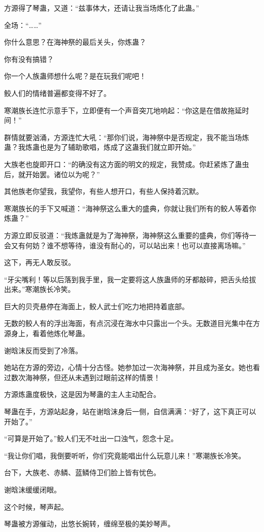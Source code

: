 \begin{this_body}
方源得了琴蛊，又道：“兹事体大，还请让我当场炼化了此蛊。”

全场：“……”

你什么意思？在海神祭的最后关头，你炼蛊？

你有没有搞错？

你一个人族蛊师想什么呢？是在玩我们呢吧！

鲛人们的情绪普遍都变得不好了。

寒潮族长连忙示意手下，立即便有一个声音突兀地响起：“你这是在借故拖延时间！”

群情就要汹涌，方源连忙大吼：“那你们说，海神祭中是否规定，我不能当场炼蛊？我炼蛊也是为了辅助歌唱，炼成了这蛊我们就立即开始。”

大族老也旋即开口：“的确没有这方面的明文的规定，我赞成。你赶紧炼了蛊虫后，就开始罢。诸位以为呢？”

其他族老你望我，我望你，有些人想开口，有些人保持着沉默。

寒潮族长的手下又喊道：“海神祭这么重大的盛典，你就让我们所有的鲛人等着你炼蛊？”

方源立即反驳道：“我炼蛊就是为了海神祭，海神祭这么重要的盛典，你们等待一会又有何妨？谁不想等待，谁没有耐心的，可以站出来！也可以直接离场嘛。”

这下，再无人敢反驳。

“牙尖嘴利！等以后落到我手里，我一定要将这人族蛊师的牙都敲碎，把舌头给拔出来。”寒潮族长冷笑。

巨大的贝壳悬停在海面上，鲛人武士们吃力地把持着底部。

无数的鲛人有的浮出海面，有点沉浸在海水中只露出一个头。无数道目光集中在方源身上，看着他炼化琴蛊。

谢晗沫反而受到了冷落。

她站在方源的旁边，心情十分古怪。她参加过一次海神祭，并且成为圣女。她也看过数次海神祭，但还从未遇到过眼前这样的情景！

方源炼蛊度极快，这是因为琴蛊的主人主动配合。

琴蛊在手，方源站起身，站在谢晗沫身后一侧，自信满满：“好了，这下真正可以开始了。”

“可算是开始了。”鲛人们无不吐出一口浊气，怨念十足。

“我让你们唱，我倒要听听，你们究竟能唱出什么玩意儿来！”寒潮族长冷笑。

台下，大族老、赤鳞、蓝鳞侍卫们脸上皆有忧色。

谢晗沫缓缓闭眼。

这个时候，琴声起。

琴蛊被方源催动，出悠长婉转，缠绵至极的美妙琴声。


\end{this_body}

